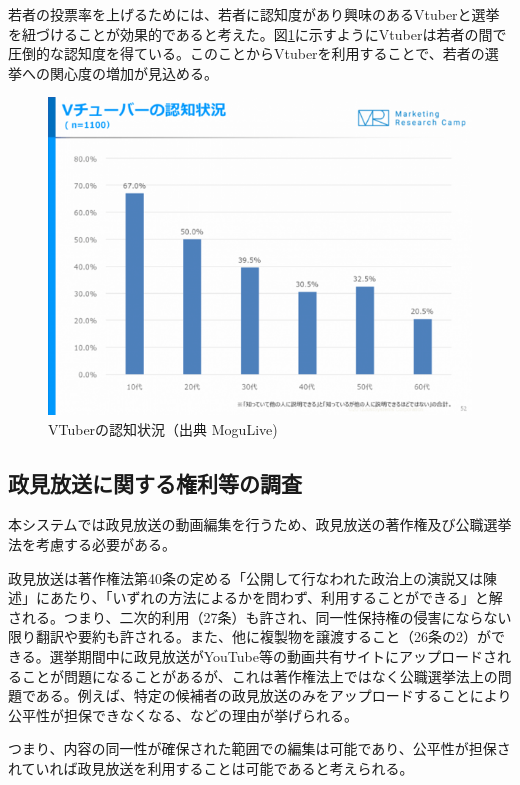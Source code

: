 \documentclass[a4paper,12pt]{jsarticle}
\begin{document}
若者の投票率を上げるためには、若者に認知度があり興味のあるVtuberと選挙を紐づけることが効果的であると考えた。図\ref{fig:vtuber}に示すようにVtuberは若者の間で圧倒的な認知度を得ている。このことからVtuberを利用することで、若者の選挙への関心度の増加が見込める。

\begin{figure}[H]
	\begin{center}
		\includegraphics[width=12.0cm]{vtube.png}
		\caption{VTuberの認知状況（出典 MoguLive\cite{vtuber})}
		\label{fig:vtuber}
	\end{center}
\end{figure}

\subsection{政見放送に関する権利等の調査}

本システムでは政見放送の動画編集を行うため、政見放送の著作権及び公職選挙法を考慮する必要がある。

政見放送は著作権法第40条の定める「公開して行なわれた政治上の演説又は陳述」にあたり、「いずれの方法によるかを問わず、利用することができる」と解される。つまり、二次的利用（27条）も許され、同一性保持権の侵害にならない限り翻訳や要約も許される。また、他に複製物を譲渡すること（26条の2）ができる\cite{law}。選挙期間中に政見放送がYouTube等の動画共有サイトにアップロードされることが問題になることがあるが、これは著作権法上ではなく公職選挙法上の問題である。例えば、特定の候補者の政見放送のみをアップロードすることにより公平性が担保できなくなる、などの理由が挙げられる\cite{wiki}。

つまり、内容の同一性が確保された範囲での編集は可能であり、公平性が担保されていれば政見放送を利用することは可能であると考えられる。
\end{document}
